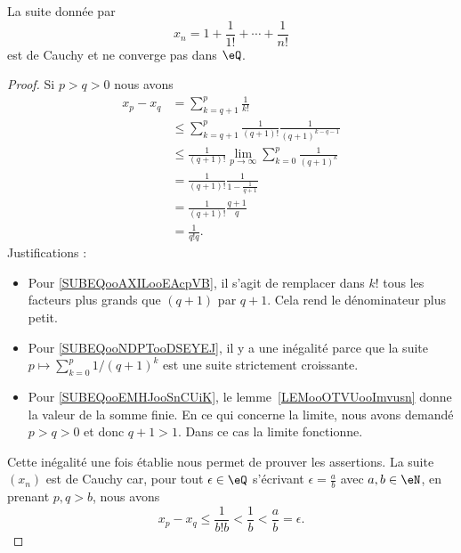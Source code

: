 \begin{proposition}
    La suite donnée par
    \begin{equation}
        x_n=1+\frac{ 1 }{ 1! }+\cdots +\frac{1}{ n! }
    \end{equation}
    est de Cauchy et ne converge pas dans \( \eQ\).
\end{proposition}

\begin{proof}
    Si \( p>q>0\) nous avons
    \begin{subequations}
        \begin{align}
            x_p-x_q&=\sum_{k=q+1}^p\frac{1}{ k! }\\
            &\leq \sum_{k=q+1}^p\frac{1}{ (q+1)! }\frac{1}{ (q+1)^{k-q-1} }  \label{SUBEQooAXILooEAcpVB}\\
            &\leq \frac{1}{ (q+1)! }\lim_{p\to \infty} \sum_{k=0}^{p}\frac{1}{ (q+1)^k }  \label{SUBEQooNDPTooDSEYEJ}\\
            &=\frac{1}{ (q+1)! }\frac{1}{ 1-\frac{1}{ q+1 } } \label{SUBEQooEMHJooSnCUiK}  \\
            &=\frac{1}{ (q+1)! }\frac{q+1}{q}\\
            &=\frac{1}{ q!q }.
        \end{align}
    \end{subequations}
    Justifications :
    \begin{itemize}
        \item Pour \eqref{SUBEQooAXILooEAcpVB}, il s'agit de remplacer dans \( k!\) tous les facteurs plus grands que \( (q+1)\) par \( q+1\). Cela rend le dénominateur plus petit.
        \item Pour \eqref{SUBEQooNDPTooDSEYEJ}, il y a une inégalité parce que la suite \( p\mapsto \sum_{k=0}^p1/(q+1)^k\) est une suite strictement croissante.

        \item Pour \eqref{SUBEQooEMHJooSnCUiK}, le lemme~\ref{LEMooOTVUooImvusn} donne la valeur de la somme finie. En ce qui concerne la limite, nous avons demandé \( p>q>0\) et donc \( q+1>1\). Dans ce cas la limite fonctionne.
    \end{itemize}

    Cette inégalité une fois établie nous permet de prouver les assertions. La suite \( (x_n) \) est de Cauchy car, pour tout \( \epsilon\in\eQ\) s'écrivant \( \epsilon=\frac{ a }{ b }\) avec \( a,b\in \eN\), en prenant \( p,q>b\), nous avons
    \begin{equation}
        x_p-x_q\leq \frac{1}{ b!b }<\frac{1}{ b }<\frac{ a }{ b }=\epsilon.
    \end{equation}


\end{proof}
